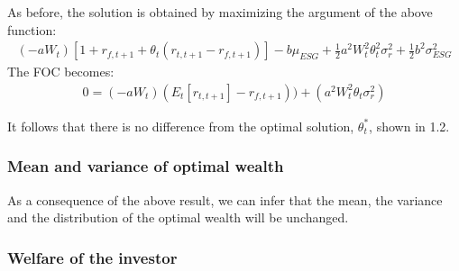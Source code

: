 \documentclass[12pt]{article}
\begin{document}
	As before, the solution is obtained by maximizing the argument of the above function: \vspace{-0.5em}
	\begin{align*}
		(-aW_t) [1 + r_{f,t+1} + \theta_t(r_{t,t+1}-r_{f, t+1})] - b\mu_{ESG} +\frac{1}{2}a^2W_t^2\theta_t^2\sigma_r^2 + \frac{1}{2}b^2\sigma_{ESG}^2
	\end{align*}
	The FOC becomes:
	\begin{align*}
		0 = (-aW_t)(E_{t}[r_{t,t+1}]-r_{f, t+1})) + (a^2W_t^2\theta_t\sigma_r^2)
	\end{align*} \vspace{-1.75em}
	
	It follows that there is no difference from the optimal solution, $\theta_{t}^*$, shown in 1.2. 
	\subsubsection{Mean and variance of optimal wealth}
	As a consequence of the above result, we can infer that the mean, the variance and the distribution of the optimal wealth will be unchanged.
	\subsubsection{Welfare of the investor}
	
\end{document}
